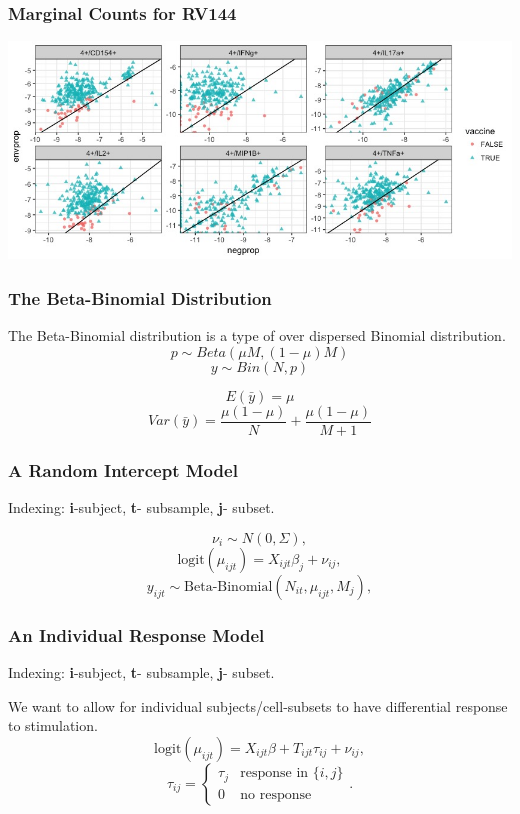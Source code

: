 \documentclass{beamer}
\theoremstyle{definition}
\begin{document}
\begin{frame}
\frametitle{Marginal Counts for RV144}
\begin{center}
\includegraphics[scale=0.4]{figures/marginalScatterNoPost}
\end{center}
\end{frame}


\begin{frame}
\frametitle{The Beta-Binomial Distribution}
The Beta-Binomial distribution is a type of over dispersed Binomial distribution.
$$
p \sim Beta(\mu M, (1 - \mu) M)
$$$$
y \sim Bin(N, p)
$$

\pause
\vspace{0.5 cm}
$$
E(\bar{y}) = \mu
$$$$
Var(\bar{y}) = \frac{\mu(1- \mu)}{N} + \frac{\mu(1 - \mu)}{M + 1}
$$
\end{frame}


\begin{frame}
\frametitle{A Random Intercept Model}
\begin{framed}
Indexing: \textbf{i}-subject, \textbf{t}- subsample, \textbf{j}- subset.
\end{framed}

$$
\nu_i \sim N(0, \Sigma),
$$$$
\text{logit}(\mu_{ijt}) = X_{ijt} \beta_j + \nu_{ij} ,
$$$$
y_{ijt} \sim \text{Beta-Binomial}(N_{it}, \mu_{ijt}, M_j) ,
$$
\end{frame}


\begin{frame}
\frametitle{An Individual Response Model}
\begin{framed}
Indexing: \textbf{i}-subject, \textbf{t}- subsample, \textbf{j}- subset.
\end{framed}

We want to allow for individual subjects/cell-subsets to have differential response to stimulation. 
$$
\text{logit}(\mu_{ijt}) = X_{ijt} \beta + T_{ijt}\tau_{ij} + \nu_{ij} ,
$$$$
\tau_{ij} = 
\begin{cases}
\tau_j & \text{response in }\{i,j\} \\
0 & \text{no response}
\end{cases}.
$$
\end{frame}
\end{document}
